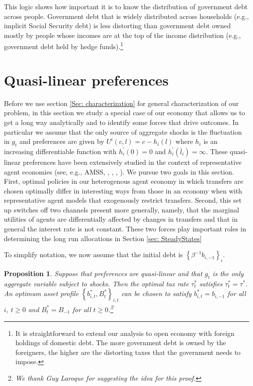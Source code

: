 \documentclass[thmsb,11pt]{article}
\newtheorem{proposition}{Proposition}
\begin{document}
This logic shows how important it is to know the distribution of government debt across people. Government debt that is widely distributed across households
(e.g., implicit Social Security debt) is less distorting than
 government debt owned mostly by people whose incomes are at the top of the income
distribution (e.g., government debt held by hedge funds).\footnote{%
It is straightforward to extend our analysis to open economy with foreign
holdings of domestic debt. The more government debt is owned by the
foreigners, the higher are the distorting taxes that  the government  needs to
impose.}

\section{Quasi-linear preferences}\label{Sec: quasilinear}
Before we use section \ref{Sec: characterization}  for general characterization of our problem, in this section we study a special case of our economy that allows us to get a long way analytically and to identify some forces that drive outcomes. In particular we assume that the only source of aggregate shocks is the fluctuation in $g_t$ and preferences are given by $U^{i}\left( c,l\right) =c-h_{i}(l)$ where $h_{i}$ is an increasing differentiable function with $h_{i}^{\prime
}\left( 0\right) =0$ and $h_{i}^{\prime }\left( \bar{l}_{i}\right) =\infty $. These quasi-linear preferences have been extensively studied in the context of representative agent economies (see, e.g.,  AMSS, \cite{Farhi2010}, \cite{Battaglini2007,Battaglini2008}, \cite{Yared2012}, \cite{Faraglia2011}). We pursue two goals in this section. First, optimal policies in our heterogenous agent  economy in which transfers are chosen optimally
 differ in interesting ways from those
 in an economy when with representative agent models that exogenously restrict  transfers. Second, this set up switches off two channels  present more generally, namely, that the marginal utilities of agents are differentially affected by changes in transfers and that in general the interest rate  is not constant. These two forces  play  important roles in determining the long run allocations in Section \ref{sec: SteadyStates}

To simplify notation, we now assume that the initial debt is $%
\left\{ \beta ^{-1}b_{i,-1}\right\} _{i}.$

\begin{proposition}
\label{Prop: quasilinear} Suppose that preferences are quasi-linear and that  $g_t$ is the only aggregate variable subject to  shocks. Then the optimal tax rate $\tau
_{t}^{\ast }$ satisfies $\tau _{t}^{\ast }=\tau ^{\ast }$. An optimum asset
profile $\left \{ b_{i,t}^{\ast },B_{t}^{\ast }\right \} _{i,t}$ can be
chosen to satisfy $b_{i,t}^{\ast }=b_{i,-1}$ for all $i,\ t\geq 0$ and $%
B_{t}^{\ast }=B_{-1}$ for all $t\geq 0$.\footnote{%
We thank Guy Laroque for suggesting the idea for this proof.}
\end{proposition}
\end{document}
